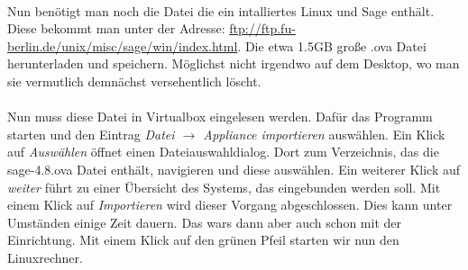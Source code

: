 \documentclass[a4paper,10pt,DIV15]{scrartcl}
\begin{document}
\paragraph{}
 Nun benötigt man noch die Datei die ein intalliertes Linux und Sage enthält. Diese bekommt man unter der Adresse:
 \url{ftp://ftp.fu-berlin.de/unix/misc/sage/win/index.html}. Die etwa 1.5GB große .ova Datei herunterladen und speichern.
Möglichst nicht irgendwo auf dem Desktop, wo man sie vermutlich demnächst versehentlich löscht. 
\paragraph{}



Nun muss diese Datei in Virtualbox eingelesen werden. Dafür das Programm starten und den Eintrag \emph{Datei $\to$ Appliance importieren} auswählen. 
Ein Klick auf \emph{Auswählen} öffnet einen Dateiauswahldialog. Dort zum Verzeichnis, das die sage-4.8.ova Datei enthält, navigieren und diese auswählen.
Ein weiterer Klick auf \emph{weiter} führt zu einer Übersicht des Systems, das eingebunden werden soll.
Mit einem Klick auf \emph{Importieren} wird dieser Vorgang abgeschlossen. Dies kann unter Umständen einige Zeit dauern. Das wars dann aber auch schon
mit der Einrichtung.
Mit einem Klick auf den grünen Pfeil starten wir nun den Linuxrechner.
\end{document}
